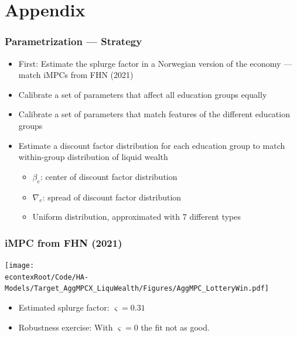 \documentclass[pdflatex,aspectratio=169]{beamer}
\begin{document}
\section{Appendix}



\begin{frame}
	\hypertarget{ParametrizationStrategy}{}
	\frametitle{Parametrization --- Strategy}
	\begin{itemize} 
		\itemsep = \bigskipamount 
		\item First: Estimate the splurge factor in a Norwegian version of the economy --- match iMPCs from FHN (2021)
		\item Calibrate a set of parameters that affect all education groups equally 
		\item Calibrate a set of parameters that match features of the different education groups 
		\item Estimate a discount factor distribution for each education group to match within-group distribution of liquid wealth
		\begin{itemize}
			\itemsep = .25\bigskipamount 
			\item $\beta_e$: center of discount factor distribution
			\item $\nabla_e$: spread of discount factor distribution 
			\item Uniform distribution, approximated with 7 different types
		\end{itemize}
	\end{itemize} 
	
	\vspace{1cm}
	\hyperlink{ConsistentWithMicroData}{}
\end{frame}

\begin{frame}
	\frametitle{iMPC from FHN (2021)}
	\centering 
	\texttt{[image: \\econtexRoot/Code/HA-Models/Target\_AggMPCX\_LiquWealth/Figures/AggMPC\_LotteryWin.pdf]}
	\begin{itemize}
		\itemsep = .5\bigskipamount 
		\item Estimated splurge factor: $\varsigma = 0.31$
		\item Robustness exercise: With $\varsigma = 0$ the fit not as good. 
	\end{itemize}

	\vspace{1cm}
	\hyperlink{ConsistentWithMicroData}{}
\end{frame}
\end{document}
